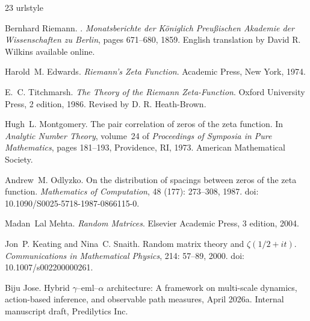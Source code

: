 \documentclass[11pt]{article}
\theoremstyle{definition}
\theoremstyle{plain}
\begin{document}
\begin{thebibliography}{23}
\providecommand{\natexlab}[1]{#1}
\providecommand{\url}[1]{\texttt{#1}}
\expandafter\ifx\csname urlstyle\endcsname\relax
  \providecommand{\doi}[1]{doi: #1}\else
  \providecommand{\doi}{doi: \begingroup \urlstyle{rm}\Url}\fi

Bernhard Riemann.
.
\newblock \emph{Monatsberichte der K\"oniglich Preu\ss ischen Akademie der
  Wissenschaften zu Berlin}, pages 671--680, 1859.
\newblock English translation by David R. Wilkins available online.

Harold~M. Edwards.
\newblock \emph{Riemann's Zeta Function}.
\newblock Academic Press, New York, 1974.

E.~C. Titchmarsh.
\newblock \emph{The Theory of the Riemann Zeta-Function}.
\newblock Oxford University Press, 2 edition, 1986.
\newblock Revised by D. R. Heath-Brown.

Hugh~L. Montgomery.
\newblock The pair correlation of zeros of the zeta function.
\newblock In \emph{Analytic Number Theory}, volume~24 of \emph{Proceedings of
  Symposia in Pure Mathematics}, pages 181--193, Providence, RI, 1973. American
  Mathematical Society.

Andrew~M. Odlyzko.
\newblock On the distribution of spacings between zeros of the zeta function.
\newblock \emph{Mathematics of Computation}, 48 (177):
  273--308, 1987.
\newblock \doi{10.1090/S0025-5718-1987-0866115-0}.

Madan~Lal Mehta.
\newblock \emph{Random Matrices}.
\newblock Elsevier Academic Press, 3 edition, 2004.

Jon~P. Keating and Nina~C. Snaith.
\newblock Random matrix theory and $\zeta(1/2+it)$.
\newblock \emph{Communications in Mathematical Physics}, 214: 57--89,
  2000.
\newblock \doi{10.1007/s002200000261}.

\bibitem[Jose(2026{\natexlab{a}})]{JoseHybridGammaEMLAlpha2026}
Biju Jose.
\newblock Hybrid $\gamma$--eml--$\alpha$ architecture: A framework on
  multi-scale dynamics, action-based inference, and observable path measures,
  April 2026{\natexlab{a}}.
\newblock Internal manuscript draft, Predilytics Inc.


\end{thebibliography}
\end{document}
